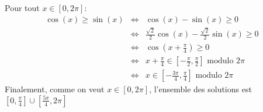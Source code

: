Pour tout $x\in[0,2\pi]$:
\begin{eqnarray*}
  \cos(x) \geq \sin(x) &\Leftrightarrow& \cos(x)-\sin(x) \geq 0 \\
    &\Leftrightarrow& \frac{\sqrt{2}}{2}\cos(x)-\frac{\sqrt{2}}{2}\sin(x) \geq 0 \\
     &\Leftrightarrow& \cos\left( x+\frac{\pi}{4} \right) \geq 0 \\
     &\Leftrightarrow&  x+\frac{\pi}{4} \in \left[ -\frac{\pi}{2}, \frac{\pi}{2} \right] \textrm{ modulo } 2\pi \\
     &\Leftrightarrow&  x\in \left[ -\frac{3\pi}{4}, \frac{\pi}{4} \right] \textrm{ modulo } 2\pi
\end{eqnarray*}
Finalement, comme on veut $x\in[0,2\pi]$, l'ensemble des solutions est $\left[0,\frac{\pi}{4} \right] \cup \left[ \frac{5\pi}{4}, 2\pi \right]$
